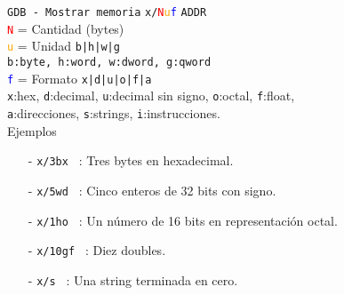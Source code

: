 \documentclass[aspectratio=169]{beamer}
\begin{document}
\begin{frame}[fragile,t]{\texttt{GDB - Mostrar memoria}}
    \small
    \verb;x/;\textcolor{red}{\texttt{N}}\textcolor{orange}{\texttt{u}}\textcolor{blue}{\texttt{f}} \verb;ADDR;\\
    \vspace{0.2cm}
    \textcolor{red}{\texttt{N}} = Cantidad (bytes)\\
    \textcolor{orange}{\texttt{u}} = Unidad \verb;b|h|w|g;\\
    \hspace{0.37cm} \verb;b:byte, h:word, w:dword, g:qword;\\
    \textcolor{blue}{\texttt{f}} = Formato \verb;x|d|u|o|f|a;\\
    \hspace{0.37cm} \verb;x;:hex, \verb;d;:decimal, \verb;u;:decimal sin signo, \verb;o;:octal, \verb;f;:float,\\
    \hspace{0.37cm} \verb;a;:direcciones, \verb;s;:strings, \verb;i;:instrucciones.\\
    \vspace{0.4cm}
    \pause
    \textcolor{verdeuca}{Ejemplos}
    \vspace{0.2cm}
    \begin{itemize}
    \item[-] \verb|x/3bx | \fbox{\textcolor{verdeuca}{addr}} \hspace{0.1cm} : Tres bytes en hexadecimal.
    \pause
    \item[-] \verb|x/5wd | \fbox{\textcolor{verdeuca}{addr}} \hspace{0.1cm} : Cinco enteros de 32 bits con signo.
    \pause
    \item[-] \verb|x/1ho | \fbox{\textcolor{verdeuca}{addr}} \hspace{0.1cm} : Un número de 16 bits en representación octal.
    \pause
    \item[-] \verb|x/10gf | \fbox{\textcolor{verdeuca}{addr}} \hspace{0.1cm} : Diez doubles.
    \pause
    \item[-] \verb|x/s | \fbox{\textcolor{verdeuca}{addr}} \hspace{0.1cm} : Una string terminada en cero.
    \end{itemize}
\end{frame}
\end{document}
